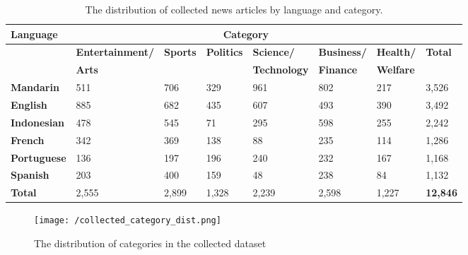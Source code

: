\documentclass{l4proj}
\begin{document}
\begin{table}[]
\begin{tabular}{llllllll}
\hline
\textbf{Language}   & \multicolumn{6}{c}{\textbf{Category}}                                                                                       &                 \\ \hline
\textbf{}           & \textbf{Entertainment/} & \textbf{Sports} & \textbf{Politics} & \textbf{Science/}     & \textbf{Business/} & \textbf{Health/}   & \textbf{Total}  \\
\textbf{}           & \textbf{Arts}         & \textbf{}       & \textbf{}         & \textbf{Technology} & \textbf{Finance} & \textbf{Welfare} & \textbf{}       \\ \hline
\textbf{Mandarin}   & 511                    & 706             & 329               & 961                  & 802               & 217               & 3,526           \\
\textbf{English}    & 885                    & 682             & 435               & 607                  & 493               & 390               & 3,492           \\
\textbf{Indonesian} & 478                    & 545             & 71                & 295                  & 598               & 255               & 2,242           \\
\textbf{French}     & 342                    & 369             & 138               & 88                   & 235               & 114               & 1,286           \\
\textbf{Portuguese} & 136                    & 197             & 196               & 240                  & 232               & 167               & 1,168           \\
\textbf{Spanish}    & 203                    & 400             & 159               & 48                   & 238               & 84                & 1,132           \\ \hline
\textbf{Total}      & 2,555                  & 2,899           & 1,328             & 2,239                & 2,598             & 1,227             & \textbf{12,846}
\\ \hline
\end{tabular}
\caption{The distribution of collected news articles by language and category.}
\label{table:collectedstats}
\end{table}

\begin{figure}[h]
\texttt{[image: /collected\_category\_dist.png]}
\caption{The distribution of categories in the collected dataset}
\label{fig:collected_cat_dist}
\end{figure}
\end{document}
